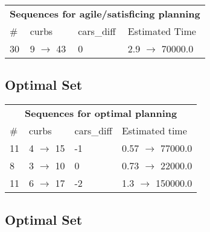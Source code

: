 \documentclass{article}
\begin{document}
                        \begin{center}
                        \begin{tabular}{@{}l|l|l|l@{}}
                        \multicolumn{4}{c}{\bf \large Sequences for agile/satisficing planning}\\
                        \# & curbs & cars\_diff & Estimated Time\\\midrule
                        30&9 $\rightarrow$ 43&0&2.9 $\rightarrow$ 70000.0
                        \end{tabular}
                        \end{center}
                    
                            \subsection*{Optimal Set}

                            \begin{center}
                            \begin{tabular}{@{}l|l|l|l@{}}
                            \multicolumn{4}{c}{\bf \large Sequences for optimal planning}\\
                            \# & curbs & cars\_diff & Estimated time\\\midrule
                            11&4 $\rightarrow$ 15&-1&0.57 $\rightarrow$ 77000.0\\
8&3 $\rightarrow$ 10&0&0.73 $\rightarrow$ 22000.0\\
11&6 $\rightarrow$ 17&-2&1.3 $\rightarrow$ 150000.0
                            \end{tabular}
                            \end{center}
                    
                                \subsection*{Optimal Set}
                                
\end{document}
